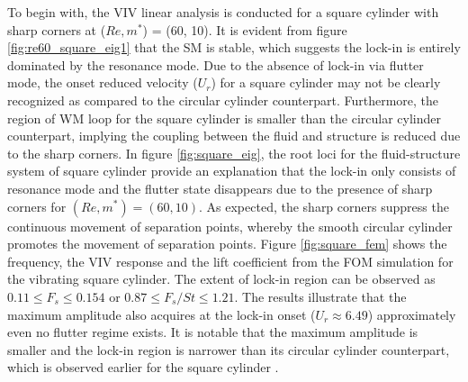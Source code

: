 \documentclass{jfm}
\begin{document}
To begin with, the VIV linear analysis is conducted 
for a square cylinder with sharp corners at ($Re, m^*$) = (60, 10). 
It is evident from figure \ref{fig:re60_square_eig1} that the SM is stable, 
which suggests the lock-in is entirely dominated by the resonance mode. Due to the absence of lock-in 
via flutter mode, the onset reduced velocity ($U_r$) for a square cylinder may not be clearly recognized as compared to the circular cylinder counterpart. 
Furthermore, the region of WM loop for the square cylinder is smaller than the circular cylinder counterpart,
implying the coupling between the fluid and structure is reduced due to the sharp corners.
%
In figure \ref{fig:square_eig}, the root loci for the fluid-structure system of square cylinder 
provide an explanation that the lock-in only consists of resonance mode 
and the flutter state disappears 
due to the presence of sharp corners for $(Re,m^*)=(60,10)$. 
As expected, the sharp corners suppress the continuous movement 
of separation points, whereby the smooth circular cylinder promotes the movement of separation points.
Figure \ref{fig:square_fem} shows the frequency,  the VIV response and 
the lift coefficient from the FOM simulation for the vibrating square cylinder. 
The extent of lock-in 
region can be observed as $0.11 \le F_{s} \le 0.154$ or $0.87 \le F_{s}/St \le 1.21$.  
The results illustrate that the maximum amplitude 
also acquires at the lock-in onset ($U_r \approx 6.49$) approximately even no flutter regime 
exists. 
%
It is notable that the maximum 
amplitude is smaller and the lock-in region is narrower than its circular cylinder counterpart, 
which is observed earlier for the square cylinder \citep{Jaiman2016a,Zhao2013b}. 
\end{document}

